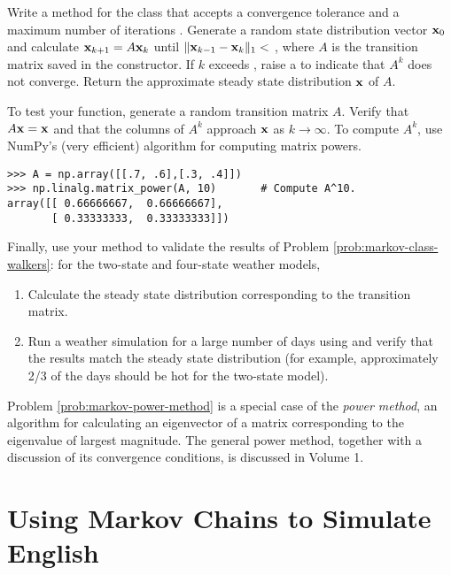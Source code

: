 \begin{problem} %
Write a method for the  class that accepts a convergence tolerance  and a maximum number of iterations .
Generate a random state distribution vector $\mathbf{x}_{0}$ and calculate $\mathbf{x}_{k+1} = A\mathbf{x}_k$ until $\|\mathbf{x}_{k-1} - \mathbf{x}_k\|_1 <$ , where $A$ is the transition matrix saved in the constructor.
If $k$ exceeds , raise a  to indicate that $A^k$ does not converge.
Return the approximate steady state distribution $\mathbf{x}$ of $A$.

To test your function, generate a random transition matrix $A$.
Verify that $A\mathbf{x} = \mathbf{x}$ and that the columns of $A^k$ approach $\mathbf{x}$ as $k\rightarrow\infty$.
To compute $A^k$, use NumPy's (very efficient) algorithm for computing matrix powers. %

\begin{lstlisting}
>>> A = np.array([[.7, .6],[.3, .4]])
>>> np.linalg.matrix_power(A, 10)       # Compute A^10.
array([[ 0.66666667,  0.66666667],
       [ 0.33333333,  0.33333333]])
\end{lstlisting}
%
Finally, use your method to validate the results of Problem \ref{prob:markov-class-walkers}:
for the two-state and four-state weather models,
\begin{enumerate}
    \item Calculate the steady state distribution corresponding to the transition matrix.
    \item Run a weather simulation for a large number of days using  and verify that the results match the steady state distribution (for example, approximately 2/3 of the days should be hot for the two-state model).
\end{enumerate}
\label{prob:markov-power-method}
\end{problem}

\begin{info}
Problem \ref{prob:markov-power-method} is a special case of the \emph{power method}, an algorithm for calculating an eigenvector of a matrix corresponding to the eigenvalue of largest magnitude.
The general power method, together with a discussion of its convergence conditions, is discussed in Volume 1.
\end{info}

\section*{Using Markov Chains to Simulate English} %

